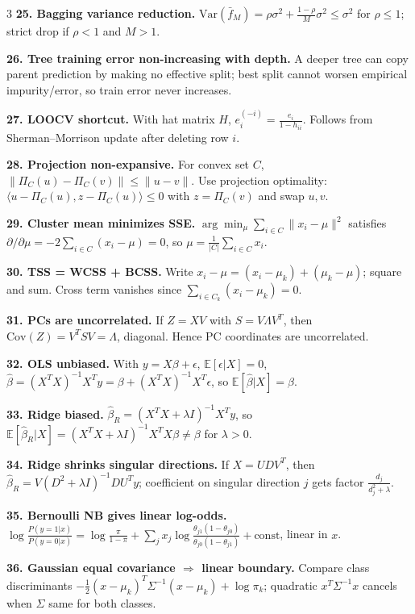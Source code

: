 \documentclass[8pt,fleqn]{extarticle}
\begin{document}
\begin{multicols}{3}
\textbf{25. Bagging variance reduction.} $\mathrm{Var}(\bar f_M)=\rho\sigma^2+\frac{1-\rho}{M}\sigma^2\le\sigma^2$ for $\rho\le1$; strict drop if $\rho<1$ and $M>1$.

\textbf{26. Tree training error non-increasing with depth.} A deeper tree can copy parent prediction by making no effective split; best split cannot worsen empirical impurity/error, so train error never increases.

\textbf{27. LOOCV shortcut.} With hat matrix $H$, $e_i^{(-i)}=\frac{e_i}{1-h_{ii}}$. Follows from Sherman--Morrison update after deleting row $i$.

\textbf{28. Projection non-expansive.} For convex set $C$, $\|\Pi_C(u)-\Pi_C(v)\|\le\|u-v\|$. Use projection optimality: $\langle u-\Pi_C(u),z-\Pi_C(u)\rangle\le0$ with $z=\Pi_C(v)$ and swap $u,v$.

\textbf{29. Cluster mean minimizes SSE.} $\arg\min_\mu\sum_{i\in C}\|x_i-\mu\|^2$ satisfies $\partial/\partial\mu=-2\sum_{i\in C}(x_i-\mu)=0$, so $\mu=\frac1{|C|}\sum_{i\in C}x_i$.

\textbf{30. TSS = WCSS + BCSS.} Write $x_i-\mu=(x_i-\mu_k)+(\mu_k-\mu)$; square and sum. Cross term vanishes since $\sum_{i\in C_k}(x_i-\mu_k)=0$.

\textbf{31. PCs are uncorrelated.} If $Z=XV$ with $S=V\Lambda V^T$, then $\mathrm{Cov}(Z)=V^TSV=\Lambda$, diagonal. Hence PC coordinates are uncorrelated.

\textbf{32. OLS unbiased.} With $y=X\beta+\epsilon$, $\mathbb E[\epsilon|X]=0$, $\hat\beta=(X^TX)^{-1}X^Ty=\beta+(X^TX)^{-1}X^T\epsilon$, so $\mathbb E[\hat\beta|X]=\beta$.

\textbf{33. Ridge biased.} $\hat\beta_R=(X^TX+\lambda I)^{-1}X^Ty$, so $\mathbb E[\hat\beta_R|X]=(X^TX+\lambda I)^{-1}X^TX\beta\neq\beta$ for $\lambda>0$.

\textbf{34. Ridge shrinks singular directions.} If $X=UDV^T$, then $\hat\beta_R=V(D^2+\lambda I)^{-1}DU^Ty$; coefficient on singular direction $j$ gets factor $\frac{d_j}{d_j^2+\lambda}$.

\textbf{35. Bernoulli NB gives linear log-odds.} $\log\frac{P(y=1|x)}{P(y=0|x)}=\log\frac{\pi}{1-\pi}+\sum_j x_j\log\frac{\theta_{j1}(1-\theta_{j0})}{\theta_{j0}(1-\theta_{j1})}+\text{const}$, linear in $x$.

\textbf{36. Gaussian equal covariance $\Rightarrow$ linear boundary.} Compare class discriminants $-\frac12(x-\mu_k)^T\Sigma^{-1}(x-\mu_k)+\log\pi_k$; quadratic $x^T\Sigma^{-1}x$ cancels when $\Sigma$ same for both classes.


\end{multicols}
\end{document}
